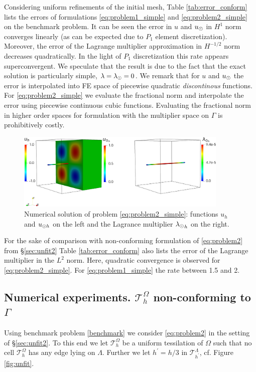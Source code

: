 Considering uniform refinements of the initial mesh, Table \ref{tab:error_conform}
lists the errors of formulations \eqref{eq:problem1_simple} and \eqref{eq:problem2_simple}
on the benchmark problem. It can be seen the error in $u$ and $u_{\odot}$ in $H^1$ norm
converges linearly (as can be expected due to $P_1$ element discretization).
Moreover, the error of the Lagrange multiplier approximation in $H^{-1/2}$ norm
decreases quadratically. In the light of $P_1$ discretization this rate appears
superconvergent. We speculate that the result is due to the fact that the
exact solution is particularly simple, $\lambda=\lambda_{\odot}=0$.
We remark that for $u$ and $u_{\odot}$ the error is interpolated into FE space of piecewise
quadratic \emph{discontinous} functions. For \eqref{eq:problem2_simple} we
evaluate the fractional norm and interpolate the error using piecewise continuous
cubic functions. Evaluating the fractional norm in higher order spaces
for formulation with the multiplier space on $\Gamma$ is prohibitively costly. 

\begin{figure}
\centering
\includegraphics[width = 0.9\textwidth]{./graphics/mfs_LM1d}
\caption{Numerical solution of problem \eqref{eq:problem2_simple}: functions $u_h$ and $u_{\odot h}$ on the left and the Lagrance multiplier ${\lambda_{\odot}}_h$ on the right.}\label{fig:sol_benchm2}
\end{figure}

For the sake of comparison with non-conforming formulation of \eqref{eq:problem2} from
\S\ref{sec:unfit2} Table \ref{tab:error_conform} also
lists the error of the Lagrange multiplier in the $L^2$ norm. Here, quadratic convergence is observed
for \eqref{eq:problem2_simple}. For \eqref{eq:problem1_simple} the rate between 1.5 and 2.


\subsection{Numerical experiments. $\mathcal{T}^{\Omega}_h$ non-conforming to $\Gamma$}\label{sec:experiment_nonconform}
Using benchmark problem \eqref{benchmark} we consider \eqref{eq:problem2} in the
setting of \S \ref{sec:unfit2}. To this end we let $\mathcal{T}^{\Omega}_h$ be a uniform
tessilation of $\Omega$ such that no cell $\mathcal{T}^{\Omega}_h$ has any edge
lying on $\Lambda$. Further we let $h^{\prime}=h/3$ in $\mathcal{T}^{\Lambda}_{h^{\prime}}$,
cf. Figure \ref{fig:unfit}.

